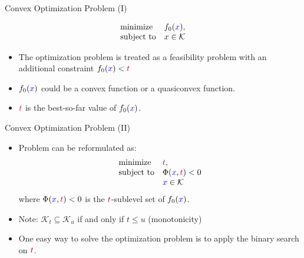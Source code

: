 \documentclass[10pt,ignorenonframetext,serif,onlymath]{beamer}
\begin{document}
\begin{frame}{Convex Optimization Problem (I)}
\protect\hypertarget{convex-optimization-problem-i}{}

\[\begin{array}{ll}
    \text{minimize}     & f_0({\color{blue}x}), \\
    \text{subject to}   & x \in \mathcal{K}
\end{array}\]

\begin{itemize}
\item
  The optimization problem is treated as a feasibility problem with an
  additional constraint \(f_0({\color{blue}x}) < {\color{purple}t}\)
\item
  \(f_0({\color{blue}x})\) could be a convex function or a quasiconvex
  function.
\item
  \({\color{purple}t}\) is the best-so-far value of
  \(f_0({\color{blue}x})\).
\end{itemize}

\end{frame}

\begin{frame}{Convex Optimization Problem (II)}
\protect\hypertarget{convex-optimization-problem-ii}{}

\begin{itemize}
\item
  Problem can be reformulated as: \[\begin{array}{ll}
              \text{minimize}         & {\color{purple}t}, \\
              \text{subject to}   & \Phi({\color{blue}x}, {\color{purple}t}) < 0 \\
                                  & {\color{blue}x} \in \mathcal{K}
    \end{array}\] where \(\Phi({\color{blue}x}, {\color{purple}t}) < 0\)
  is the \({\color{purple}t}\)-sublevel set of \(f_0({\color{blue}x})\).
\item
  Note: \(\mathcal{K}_t \subseteq \mathcal{K}_u\) if and only if
  \(t \leq u\) (monotonicity)
\item
  One easy way to solve the optimization problem is to apply the binary
  search on \({\color{purple}t}\).
\end{itemize}

\end{frame}
\end{document}
